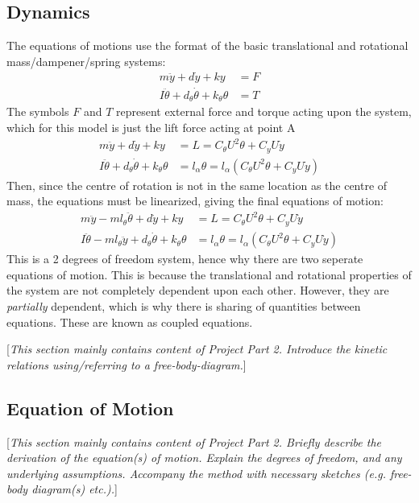 \documentclass[11pt]{article}
\begin{document}
\subsection*{Dynamics}\label{sec:dyn}
The equations of motions use the format of the basic translational and rotational mass/dampener/spring systems:
\begin{align*}
  m\ddot{y} + d\dot{y} + ky &= F \\
  I\ddot{\theta} + d_{\theta}\dot{\theta} + k_{\theta}\theta &= T
\end{align*}
The symbols $F$ and $T$ represent external force and torque acting upon the system, which for this model is just the lift force acting at point A
\begin{align*}
  m\ddot{y} + d\dot{y} + ky &= L = C_{\theta}U^2\theta + C_yU\dot{y} \\
  I\ddot{\theta} + d_{\theta}\dot{\theta} + k_{\theta}\theta &= l_{\alpha}\theta = l_{\alpha}(C_{\theta}U^2\theta + C_yU\dot{y})
\end{align*}
Then, since the centre of rotation is not in the same location as the centre of mass, the equations must be linearized, giving the final equations of motion:
\begin{align}
  m\ddot{y} - ml_{\theta}\ddot{\theta} + d\dot{y} + ky &= L = C_{\theta}U^2\theta + C_yU\dot{y}\label{eq:eom1} \\
  I\ddot{\theta} - ml_{\theta}\ddot{y} + d_{\theta}\dot{\theta} + k_{\theta}\theta &= l_{\alpha}\theta = l_{\alpha}(C_{\theta}U^2\theta + C_yU\dot{y})\label{eq:eom2}
\end{align}
This is a 2 degrees of freedom system, hence why there are two seperate equations of motion. This is because the translational and rotational properties of the system are not completely dependent upon each other. However, they are \textsl{partially} dependent, which is why there is sharing of quantities between equations. These are known as coupled equations.

[\textcolor[rgb]{0.80,0.29,0.09}{\textsl{This section mainly contains content of Project Part 2. Introduce the kinetic relations using/referring to a free-body-diagram.}}] 

\subsection*{Equation of Motion}\label{sec:eom}
[\textcolor[rgb]{0.80,0.29,0.09}{\textsl{This section mainly contains content of Project Part 2. Briefly describe the derivation of the equation(s) of motion. Explain the degrees of freedom, and any underlying assumptions. Accompany the method with necessary sketches (e.g. free-body diagram(s) etc.).}}]
\end{document}
